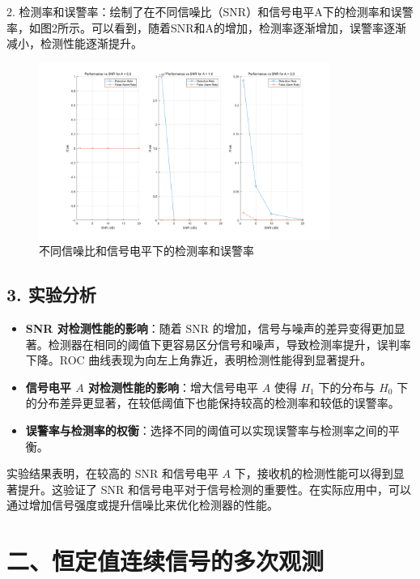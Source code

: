 \documentclass[12pt]{ctexart}
\begin{document}
2. 检测率和误警率：绘制了在不同信噪比（SNR）和信号电平A下的检测率和误警率，如图2所示。可以看到，随着SNR和A的增加，检测率逐渐增加，误警率逐渐减小，检测性能逐渐提升。

\begin{figure}[H]
    \centering
    \includegraphics[width=0.85\textwidth]{image/output2.png}
    \caption{不同信噪比和信号电平下的检测率和误警率}
    \label{fig:pd_pfa}

\end{figure}

\subsection*{3. 实验分析}
\begin{itemize}
    \item \textbf{SNR 对检测性能的影响}：随着 SNR 的增加，信号与噪声的差异变得更加显著。检测器在相同的阈值下更容易区分信号和噪声，导致检测率提升，误判率下降。ROC 曲线表现为向左上角靠近，表明检测性能得到显著提升。
    \item \textbf{信号电平 \( A \) 对检测性能的影响}：增大信号电平 \( A \) 使得 \( H_1 \) 下的分布与 \( H_0 \) 下的分布差异更显著，在较低阈值下也能保持较高的检测率和较低的误警率。
    \item \textbf{误警率与检测率的权衡}：选择不同的阈值可以实现误警率与检测率之间的平衡。
\end{itemize}

实验结果表明，在较高的 SNR 和信号电平 \( A \) 下，接收机的检测性能可以得到显著提升。这验证了 SNR 和信号电平对于信号检测的重要性。在实际应用中，可以通过增加信号强度或提升信噪比来优化检测器的性能。

\section*{二、恒定值连续信号的多次观测}
\end{document}
